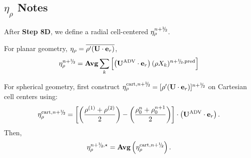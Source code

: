 \documentclass{aastex62}
\newcommand{\sfrac}[2]{\mathchoice
  {\kern0em\raise.5ex\hbox{\the\scriptfont0 #1}\kern-.15em/
   \kern-.15em\lower.25ex\hbox{\the\scriptfont0 #2}}
  {\kern0em\raise.5ex\hbox{\the\scriptfont0 #1}\kern-.15em/
   \kern-.15em\lower.25ex\hbox{\the\scriptfont0 #2}}
  {\kern0em\raise.5ex\hbox{\the\scriptscriptfont0 #1}\kern-.2em/
   \kern-.15em\lower.25ex\hbox{\the\scriptscriptfont0 #2}}
  {#1\!/#2}}
\newcommand{\myhalf}{\sfrac{1}{2}}
\newcommand{\eb}{{\bf{e}}}
\newcommand{\Ub}{{\bf{U}}}
\newcommand{\etarho}{\eta_\rho}
\newcommand{\pred}{{\rm pred}}
\newcommand{\nph}{{n+\myhalf}}
\newcommand{\uadvtwo}{\Ub^{\mathrm{ADV}}}
\begin{document}
\subsection{$\eta_\rho$ Notes}
After {\bf Step 8D}, we define a radial cell-centered $\etarho^{\nph}$.

\begin{description}
\item For planar geometry, $\etarho = \overline{\rho'(\Ub\cdot\eb_r)}$,
\begin{equation}
 \etarho^{\nph} =  {\rm {\bf Avg}} \sum_k \left[ \left(\uadvtwo \cdot \eb_r \right) (\rho X_k)^{\nph,\pred} \right]
\end{equation}
\item For spherical geometry, first construct 
$\etarho^{{\rm cart},\nph} = [\rho'(\Ub\cdot\eb_r)]^{\nph}$ on Cartesian cell centers using:
\begin{equation}
\etarho^{{\rm cart},\nph} = \left[\left(\frac{\rho^{(1)}+\rho^{(2)}}{2}\right)-\left(\frac{\rho_0^n+\rho_0^{n+1}}{2}\right)\right] \cdot \left( \uadvtwo \cdot \eb_r \right).
\end{equation}
Then,
\begin{equation}
\etarho^{\nph,\star} = {\rm {\bf Avg}}\left(\etarho^{{\rm cart},\nph}\right).
\end{equation}
\end{description}
\end{document}
